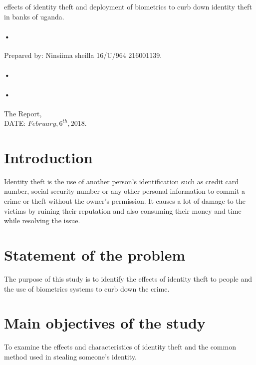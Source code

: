 \documentclass[12pt,]{article}
\begin{document}
\begin{titlepage}
\centerline{effects of identity theft and deployment of biometrics to curb down identity theft in banks of uganda.\\}
\paragraph*{•}
\centerline{  Prepared by:  Ninsiima sheilla 16/U/964 216001139.\\}
\paragraph*{•}
\paragraph*{•}
  \begin{flushright}
  The Report,\\
  DATE: $February,6^{th},2018$.
 \tableofcontents

  \end{flushright}
\date{\today}
\end{titlepage}

\newpage





\section{Introduction}
Identity theft is the use of another person’s identification such as credit card number, social security number or any other personal information to commit a crime or theft without the owner’s permission.
It causes a lot of damage to the victims by ruining their reputation and also consuming their money and time while resolving the issue.

\section{Statement of the problem}
The purpose of this study is to identify the effects of identity theft  to people and the use of biometrics systems to curb down the crime.

\section{Main objectives of the study}
To examine the effects and characteristics of identity theft and the common method used in stealing someone’s identity.
\end{document}
